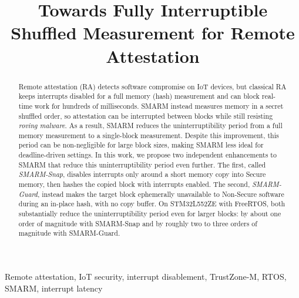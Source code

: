\documentclass[conference]{IEEEtran}
\newcommand{\smarmcopy}{SMARM-Snap\xspace}
\newcommand{\smarmlock}{SMARM-Guard\xspace}
\begin{document}
\title{Towards Fully Interruptible Shuffled Measurement for Remote Attestation}


\maketitle

\begin{abstract}
Remote attestation (RA) detects software compromise on IoT devices, but
classical RA keeps interrupts disabled for a full memory (hash) measurement and can block real-time work for hundreds of milliseconds.
SMARM instead measures memory in a secret shuffled order, so attestation can be interrupted between blocks while still resisting
\emph{roving malware}.
As a result, SMARM reduces the uninterruptibility period from a full memory measurement to a single-block measurement.
Despite this improvement, this period can be non-negligible for large block sizes, making SMARM less ideal for deadline-driven settings.
In this work, we propose two independent enhancements to SMARM that reduce this uninterruptibility period even further.
The first, called \emph{\smarmcopy}, disables interrupts only around a short memory copy into Secure memory, then hashes the copied block with interrupts enabled.
The second, \emph{\smarmlock}, instead makes the target block ephemerally unavailable to Non-Secure software during an
in-place hash, with no copy buffer.
On STM32L552ZE with FreeRTOS, both substantially reduce the uninterruptibility period even for larger blocks: by about one order of magnitude with \smarmcopy{} and by roughly two to three orders of magnitude with \smarmlock.
\end{abstract}

\begin{IEEEkeywords}
Remote attestation, IoT security, interrupt disablement, TrustZone-M, RTOS,
SMARM, interrupt latency
\end{IEEEkeywords}
\end{document}
